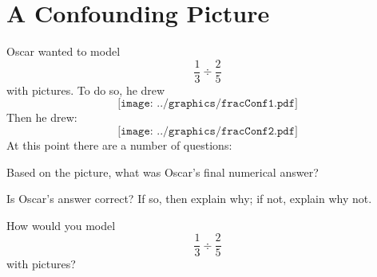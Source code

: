\newpage
\activity\section{A Confounding Picture}


Oscar wanted to model
\[
\frac{1}{3}\div \frac{2}{5}
\]
with pictures. To do so, he drew
\[
\texttt{[image: ../graphics/fracConf1.pdf]}
\]
Then he drew:
\[
\texttt{[image: ../graphics/fracConf2.pdf]}
\]
At this point there are a number of questions:

\begin{prob} 
Based on the picture, what was Oscar's final numerical answer?
\end{prob}

\begin{prob}
Is Oscar's answer correct? If so, then explain why; if not, explain
why not.
\end{prob}

\begin{prob} How would you model
\[
\frac{1}{3}\div \frac{2}{5}
\]
with pictures?
\end{prob}

